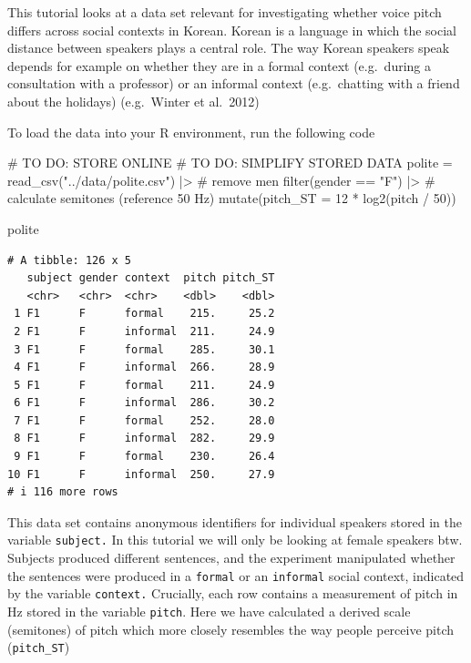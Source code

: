 \documentclass[
  doc,
  longtable,
  nolmodern,
  notxfonts,
  notimes,
  colorlinks=true,linkcolor=blue,citecolor=blue,urlcolor=blue]{apa7}
\newenvironment{Shaded}{\begin{snugshade}}{\end{snugshade}}
\newcommand{\AttributeTok}[1]{\textcolor[rgb]{0.40,0.45,0.13}{#1}}
\newcommand{\CommentTok}[1]{\textcolor[rgb]{0.37,0.37,0.37}{#1}}
\newcommand{\DecValTok}[1]{\textcolor[rgb]{0.68,0.00,0.00}{#1}}
\newcommand{\FunctionTok}[1]{\textcolor[rgb]{0.28,0.35,0.67}{#1}}
\newcommand{\NormalTok}[1]{\textcolor[rgb]{0.00,0.23,0.31}{#1}}
\newcommand{\OtherTok}[1]{\textcolor[rgb]{0.00,0.23,0.31}{#1}}
\newcommand{\SpecialCharTok}[1]{\textcolor[rgb]{0.37,0.37,0.37}{#1}}
\newcommand{\StringTok}[1]{\textcolor[rgb]{0.13,0.47,0.30}{#1}}
\begin{document}
This tutorial looks at a data set relevant for investigating whether
voice pitch diﬀers across social contexts in Korean. Korean is a
language in which the social distance between speakers plays a central
role. The way Korean speakers speak depends for example on whether they
are in a formal context (e.g.~during a consultation with a professor) or
an informal context (e.g.~chatting with a friend about the holidays)
(e.g.~Winter et al.~2012)

To load the data into your R environment, run the following code

\begin{Shaded}
\begin{Highlighting}[]
\CommentTok{\# TO DO: STORE ONLINE}
\CommentTok{\# TO DO: SIMPLIFY STORED DATA}
\NormalTok{polite }\OtherTok{=} \FunctionTok{read\_csv}\NormalTok{(}\StringTok{"../data/polite.csv"}\NormalTok{) }\SpecialCharTok{|\textgreater{}} 
  \CommentTok{\# remove men}
  \FunctionTok{filter}\NormalTok{(gender }\SpecialCharTok{==} \StringTok{"F"}\NormalTok{) }\SpecialCharTok{|\textgreater{}} 
  \CommentTok{\# calculate semitones (reference 50 Hz)}
  \FunctionTok{mutate}\NormalTok{(}\AttributeTok{pitch\_ST =} \DecValTok{12} \SpecialCharTok{*} \FunctionTok{log2}\NormalTok{(pitch }\SpecialCharTok{/} \DecValTok{50}\NormalTok{))}

\NormalTok{polite}
\end{Highlighting}
\end{Shaded}

\begin{verbatim}
# A tibble: 126 x 5
   subject gender context  pitch pitch_ST
   <chr>   <chr>  <chr>    <dbl>    <dbl>
 1 F1      F      formal    215.     25.2
 2 F1      F      informal  211.     24.9
 3 F1      F      formal    285.     30.1
 4 F1      F      informal  266.     28.9
 5 F1      F      formal    211.     24.9
 6 F1      F      informal  286.     30.2
 7 F1      F      formal    252.     28.0
 8 F1      F      informal  282.     29.9
 9 F1      F      formal    230.     26.4
10 F1      F      informal  250.     27.9
# i 116 more rows
\end{verbatim}

This data set contains anonymous identifiers for individual speakers
stored in the variable \texttt{subject.} In this tutorial we will only
be looking at female speakers btw. Subjects produced diﬀerent sentences,
and the experiment manipulated whether the sentences were produced in a
\texttt{formal} or an \texttt{informal} social context, indicated by the
variable \texttt{context.} Crucially, each row contains a measurement of
pitch in Hz stored in the variable \texttt{pitch}. Here we have
calculated a derived scale (semitones) of pitch which more closely
resembles the way people perceive pitch (\texttt{pitch\_ST})
\end{document}

